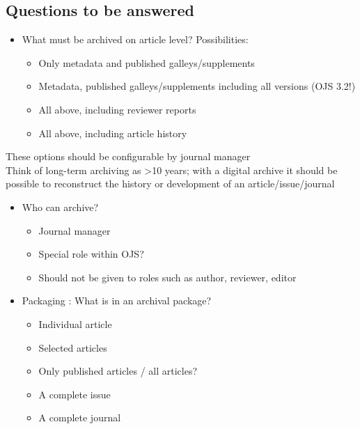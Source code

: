 \documentclass{article}
\begin{document}
\subsection[{Questions to be answered}]{\label{78nkvdvvmi5r}Questions to be answered}
\begin{itemize}
\item What must be archived on article level? Possibilities:
\begin{itemize}
\item Only metadata and published galleys/supplements
\item Metadata, published galleys/supplements including all versions (OJS 3.2!)
\item All above, including reviewer reports
\item All above, including article history
\end{itemize} 
\end{itemize} \par
These options should be configurable by journal manager{\hskip1pt}\\{}Think of long-term archiving as >10 years; with a digital archive it should be possible to reconstruct the history or development of an article/issue/journal
\begin{itemize}
\item Who can archive?
\begin{itemize}
\item Journal manager
\item Special role within OJS?
\item Should not be given to roles such as author, reviewer, editor
\end{itemize} 
\end{itemize} 
\begin{itemize}
\item Packaging : What is in an archival package?
\begin{itemize}
\item Individual article
\item Selected articles
\item Only published articles / all articles?
\item A complete issue
\item A complete journal
\end{itemize} 
\end{itemize} 
\end{document}
